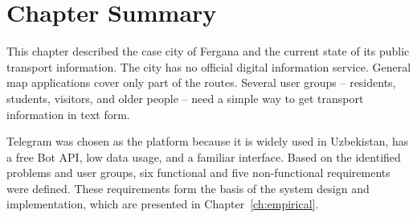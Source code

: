 \section{Chapter Summary}
\label{sec:ch2-summary}

This chapter described the case city of Fergana and the current state
of its public transport information. The city has no official digital
information service. General map applications cover only part of the
routes. Several user groups -- residents, students, visitors, and
older people -- need a simple way to get transport information in text
form.

Telegram was chosen as the platform because it is widely used in
Uzbekistan, has a free Bot API, low data usage, and a familiar
interface. Based on the identified problems and user groups, six
functional and five non-functional requirements were defined. These
requirements form the basis of the system design and implementation,
which are presented in Chapter~\ref{ch:empirical}.